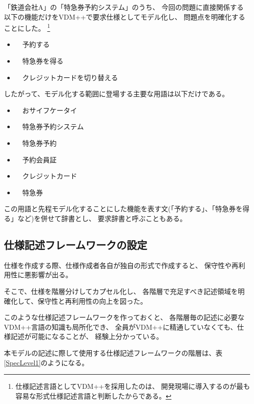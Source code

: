 「鉄道会社A」の「特急券予約システム」のうち、
今回の問題に直接関係する
以下の機能だけをVDM++\cite{SCSK2012PP}で要求仕様としてモデル化し、
問題点を明確化することにした。
\footnote{仕様記述言語としてVDM++を採用したのは、
開発現場に導入するのが最も容易な形式仕様記述言語と判断したからである。
}

\begin{itemize}
\item　予約する
\item　特急券を得る
\item　クレジットカードを切り替える
\end{itemize} 

したがって、モデル化する範囲に登場する主要な用語は以下だけである。
\begin{itemize}
\item　おサイフケータイ
\item　特急券予約システム
\item　特急券予約
\item　予約会員証
\item　クレジットカード
\item　特急券
\end{itemize} 

この用語と先程モデル化することにした機能を表す文(「予約する」、「特急券を得る」など)を併せて辞書とし、
要求辞書と呼ぶこともある。

\subsection {仕様記述フレームワークの設定}
	\label{sec:specFM}

仕様を作成する際、仕様作成者各自が独自の形式で作成すると、
保守性や再利用性に悪影響が出る。

そこで、仕様を階層分けしてカプセル化し、
各階層で充足すべき記述領域を明確化して、保守性と再利用性の向上を図った。

このような仕様記述フレームワークを作っておくと、
各階層毎の記述に必要なVDM++言語の知識も局所化でき、
全員がVDM++に精通していなくても、仕様記述が可能になることが、
経験上分かっている。

本モデルの記述に際して使用する仕様記述フレームワークの階層は、表\ref{SpecLevel1}のようになる。

